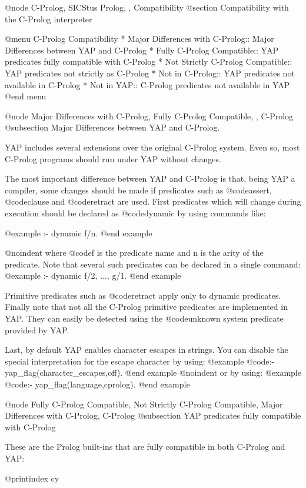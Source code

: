 {{{{{{{{{@node C-Prolog, SICStus Prolog, , Compatibility
@section Compatibility with the C-Prolog interpreter

@menu
C-Prolog Compatibility
* Major Differences with C-Prolog:: Major Differences between YAP and C-Prolog
* Fully C-Prolog Compatible:: YAP predicates fully compatible with
C-Prolog
* Not Strictly C-Prolog Compatible:: YAP predicates not strictly as C-Prolog
* Not in C-Prolog:: YAP predicates not available in C-Prolog
* Not in YAP:: C-Prolog predicates not available in YAP
@end menu

@node Major Differences with C-Prolog, Fully C-Prolog Compatible, , C-Prolog
@subsection Major Differences between YAP and C-Prolog.

YAP includes several extensions over the original C-Prolog system. Even
so, most C-Prolog programs should run under YAP without changes.

The most important difference between YAP and C-Prolog is that, being
YAP a compiler, some changes should be made if predicates such as
@code{assert}, @code{clause} and @code{retract} are used. First
predicates which will change during execution should be declared as
@code{dynamic} by using commands like:

@example
:- dynamic f/n.
@end example

@noindent where @code{f} is the predicate name and n is the arity of the
predicate. Note that  several such predicates can be declared in a
single command:
@example
 :- dynamic f/2, ..., g/1.
@end example

Primitive predicates such as @code{retract} apply only to dynamic
predicates.  Finally note that not all the C-Prolog primitive predicates
are implemented in YAP. They can easily be detected using the
@code{unknown} system predicate provided by YAP.

Last, by default YAP enables character escapes in strings. You can
disable the special interpretation for the escape character by using:
@example
@code{:- yap_flag(character_escapes,off).}
@end example
@noindent
or by using:
@example
@code{:- yap_flag(language,cprolog).}
@end example

@node Fully C-Prolog Compatible, Not Strictly C-Prolog Compatible, Major Differences with C-Prolog, C-Prolog
@subsection YAP predicates fully compatible with C-Prolog

These are the Prolog built-ins that are fully compatible in both
C-Prolog and YAP:

@printindex cy

}}}}}}}}}
